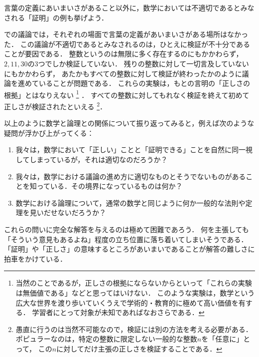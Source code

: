 言葉の定義にあいまいさがあること以外に，数学においては不適切であるとみなされる「証明」の例も挙げよう．


での議論では，それぞれの場面で言葉の定義があいまいさがある場所はなかった．
この議論が不適切であるとみなされるのは，ひとえに検証が不十分であることが要因である．
整数というのは無限に多く存在するのにもかかわらず，\(2, 11, 30\)の3つでしか検証していない．
残りの整数に対して一切言及していないにもかかわらず，
あたかもすべての整数に対して検証が終わったかのように議論を進めていることが問題である．
これらの実験は，もとの言明の「正しさの根拠」とはなりえない%
\footnote{%
	当然のことであるが，正しさの根拠にならないからといって「これらの実験は無価値である」などと思ってはいけない．
	このような実験は，数学という広大な世界を渡り歩いていくうえで学術的・教育的に極めて高い価値を有する．
	学習者にとって対象が未知であればなおさらである．
}%
．
すべての整数に対してもれなく検証を終えて初めて正しさが検証されたといえる%
\footnote{%
	愚直に行うのは当然不可能なので，検証には別の方法を考える必要がある．
	ポピュラーなのは，特定の整数に限定しない一般的な整数\(n\)を「任意に」とって，
	この\(n\)に対してだけ主張の正しさを検証することである．
}．

以上のように数学と論理との関係について振り返ってみると，例えば次のような疑問が浮かび上がってくる：
\begin{enumerate}
	\item 我々は，数学において「正しい」ことと「証明できる」ことを自然に同一視してしまっているが，それは適切なのだろうか？
	\item 我々は，数学における議論の進め方に適切なものとそうでないものがあることを知っている．その境界になっているものは何か？
	\item 数学における論理について，通常の数学と同じように何か一般的な法則や定理を見いだせないだろうか？
\end{enumerate}
これらの問いに完全な解答を与えるのは極めて困難であろう．
何を主張しても「そういう意見もあるよね」程度の立ち位置に落ち着いてしまいそうである．
「証明」や「正しさ」の意味するところがあいまいであることが解答の難しさに拍車をかけている．

